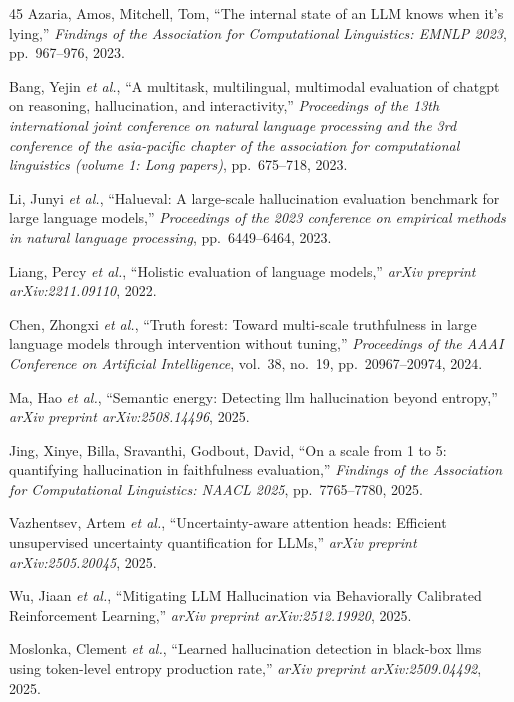 \documentclass[journal]{IEEEtran}
\begin{document}
\begin{thebibliography}{45}
Azaria, Amos, Mitchell, Tom, ``The internal state of an LLM knows when it's lying,'' \emph{Findings of the Association for Computational Linguistics: EMNLP 2023}, pp.~967--976, 2023.

Bang, Yejin \emph{et al.}, ``A multitask, multilingual, multimodal evaluation of chatgpt on reasoning, hallucination, and interactivity,'' \emph{Proceedings of the 13th international joint conference on natural language processing and the 3rd conference of the asia-pacific chapter of the association for computational linguistics (volume 1: Long papers)}, pp.~675--718, 2023.

Li, Junyi \emph{et al.}, ``Halueval: A large-scale hallucination evaluation benchmark for large language models,'' \emph{Proceedings of the 2023 conference on empirical methods in natural language processing}, pp.~6449--6464, 2023.

Liang, Percy \emph{et al.}, ``Holistic evaluation of language models,'' \emph{arXiv preprint arXiv:2211.09110}, 2022.

Chen, Zhongxi \emph{et al.}, ``Truth forest: Toward multi-scale truthfulness in large language models through intervention without tuning,'' \emph{Proceedings of the AAAI Conference on Artificial Intelligence}, vol.~38, no.~19, pp.~20967--20974, 2024.

Ma, Hao \emph{et al.}, ``Semantic energy: Detecting llm hallucination beyond entropy,'' \emph{arXiv preprint arXiv:2508.14496}, 2025.

Jing, Xinye, Billa, Sravanthi, Godbout, David, ``On a scale from 1 to 5: quantifying hallucination in faithfulness evaluation,'' \emph{Findings of the Association for Computational Linguistics: NAACL 2025}, pp.~7765--7780, 2025.

Vazhentsev, Artem \emph{et al.}, ``Uncertainty-aware attention heads: Efficient unsupervised uncertainty quantification for LLMs,'' \emph{arXiv preprint arXiv:2505.20045}, 2025.

Wu, Jiaan \emph{et al.}, ``Mitigating LLM Hallucination via Behaviorally Calibrated Reinforcement Learning,'' \emph{arXiv preprint arXiv:2512.19920}, 2025.

Moslonka, Clement \emph{et al.}, ``Learned hallucination detection in black-box llms using token-level entropy production rate,'' \emph{arXiv preprint arXiv:2509.04492}, 2025.


\end{thebibliography}
\end{document}
